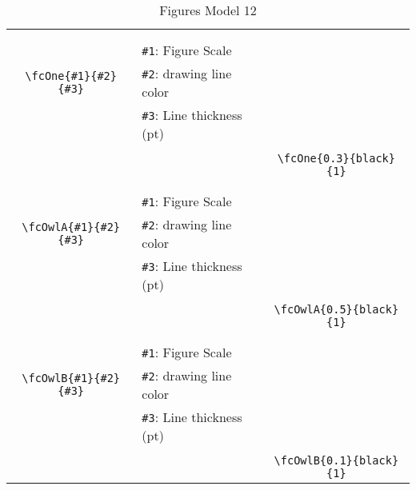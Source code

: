 \documentclass{article}
\begin{document}
\begin{table}[H]
\begin{tabular}{|c|l|c|}
	&&\multirow{5}{*}{\fcOne{0.3}{black}{1}}\\	&&\\	&\verb|#1|: Figure Scale &\\	\verb|\fcOne{#1}{#2}{#3}|&	\verb|#2|: drawing line color &\\	&\verb|#3|: Line thickness (pt) &\\ &&\\&&	\verb|\fcOne{0.3}{black}{1}|\\\hline 	
	&&\multirow{5}{*}{\fcOwlA{0.5}{black}{1}}\\	&&\\	&\verb|#1|: Figure Scale &\\	\verb|\fcOwlA{#1}{#2}{#3}|&	\verb|#2|: drawing line color &\\	&\verb|#3|: Line thickness (pt) &\\ &&\\&&	\verb|\fcOwlA{0.5}{black}{1}|\\\hline 	
	&&\multirow{5}{*}{\fcOwlB{0.1}{black}{1}}\\	&&\\	&\verb|#1|: Figure Scale &\\	\verb|\fcOwlB{#1}{#2}{#3}|&	\verb|#2|: drawing line color &\\	&\verb|#3|: Line thickness (pt) &\\ &&\\&&	\verb|\fcOwlB{0.1}{black}{1}|\\\hline 	\hline\end{tabular}\caption{Figures Model 12}\label{tab12}\end{table}
\end{document}
